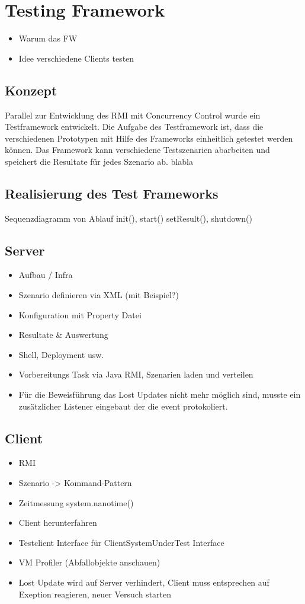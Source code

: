 \section{Testing Framework}
\label{sec:testing Framework}
\begin{itemize}
\item Warum das FW
\item Idee verschiedene Clients testen
\end{itemize}

\subsection{Konzept}
Parallel zur Entwicklung des RMI mit Concurrency Control wurde ein Testframework entwickelt. Die Aufgabe des Testframework ist, dass die verschiedenen Prototypen mit Hilfe des Frameworks einheitlich getestet werden können. Das Framework kann verschiedene Testszenarien abarbeiten und speichert die Resultate für jedes Szenario ab. blabla


\subsection{Realisierung des Test Frameworks}
\label{sec:real test-FW}
Sequenzdiagramm von Ablauf init(), start() setResult(), shutdown()

\subsection{Server}
\label{sec:test-FW Server}
\begin{itemize}
\item Aufbau / Infra
\item Szenario definieren via XML (mit Beispiel?)
\item Konfiguration mit Property Datei
\item Resultate \& Auswertung
\item Shell, Deployment usw.
\item Vorbereitungs Task via Java RMI, Szenarien laden und verteilen
\item Für die Beweisführung das Lost Updates nicht mehr möglich sind, musste ein zusätzlicher Listener eingebaut der die event protokoliert.

\end{itemize}

\subsection{Client}
\label{sec:test-FW Client}
\begin{itemize}
\item RMI
\item Szenario -> Kommand-Pattern
\item Zeitmessung system.nanotime()
\item Client herunterfahren
\item Testclient Interface für ClientSystemUnderTest Interface
\item VM Profiler (Abfallobjekte anschauen)
\item Lost Update wird auf Server verhindert, Client muss entsprechen auf Exeption reagieren, neuer Versuch starten
\end{itemize}